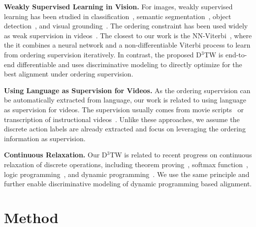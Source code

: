 \documentclass[10pt,twocolumn,letterpaper]{article}
\newcommand{\dttw}{D${}^3$TW\xspace}
\begin{document}
\vspace{1mm}
\noindent\textbf{Weakly Supervised Learning in Vision.}  For images, weakly supervised learning has been studied in classification~\cite{wu2015deep,mahajan2018exploring}, semantic segmentation~\cite{zhang2015weakly}, object detection~\cite{kumar2016track}, and visual grounding~\cite{karpathy2015deep,xiao2017weakly}. The ordering constraint has been used widely as weak supervision in videos~\cite{bojanowski2014weakly,bojanowski2015weakly,ding2018weakly,huang2016connectionist,richard2017weakly,richard2018neuralnetwork}. The closest to our work is the NN-Viterbi~\cite{richard2018neuralnetwork}, where the it combines a neural network and a non-differentiable Viterbi process to learn from ordering supervision iteratively. In contrast, the proposed \dttw is end-to-end differentiable and uses discriminative modeling to directly optimize for the best alignment under ordering supervision. 



\vspace{1mm}
\noindent\textbf{Using Language as Supervision for Videos.} As the ordering supervision can be automatically extracted from language, our work is related to using language as supervision for videos. The supervision usually comes from movie scripts~\cite{duchenne2009automatic,bojanowski2015weakly,zhu2015aligning} or transcription of instructional videos~\cite{alayrac2015learning,sener2015unsupervised,malmaud2015s,huang-buch-2018-finding-it}. Unlike these approaches, we assume the discrete action labels are already extracted and focus on leveraging the ordering information as supervision.


\vspace{1mm}
\noindent\textbf{Continuous Relaxation.} 
Our \dttw  is related to recent progress on continuous relaxation of discrete operations, including theorem proving~\cite{rocktaschel2017end}, softmax function~\cite{jang2017categorical}, logic programming~\cite{evans2018learning}, and dynamic programming~\cite{mensch2018differentiable, cuturi2017soft}. We use the same principle and further enable discriminative modeling of dynamic programming based alignment.
 \section{Method}
\label{sec:method}
\end{document}
